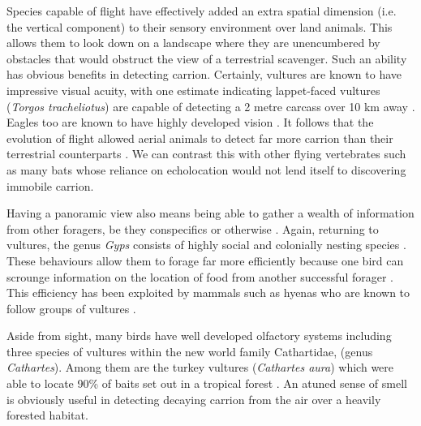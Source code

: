 \documentclass[a4paper,12pt]{article}
\begin{document}
Species capable of flight have effectively added an extra spatial dimension (i.e. the vertical component) to their sensory environment over land animals.
This allows them to look down on a landscape where they are unencumbered by obstacles that would obstruct the view of a terrestrial scavenger.
Such an ability has obvious benefits in detecting carrion.
Certainly, vultures are known to have impressive visual acuity, with one estimate indicating lappet-faced vultures %
 (\textit{Torgos tracheliotus}) are capable of detecting a 2 metre carcass over 10 km away \citep{spiegel2013factors}.
Eagles too are known to have highly developed vision \citep{reymond1985spatial}.
It follows that the evolution of flight allowed aerial animals to detect far more carrion than their terrestrial counterparts \citep{AR:AR22815}.
We can contrast this with other flying vertebrates such as many bats whose reliance on echolocation would not lend itself to discovering immobile carrion.
% 


Having a panoramic view also means being able to gather a wealth of information from other foragers, be they conspecifics or otherwise \citep{jackson2008effect}.
Again, returning to vultures, the genus \textit{Gyps} consists of highly social and colonially nesting species \citep{fernandez2015density}.
These behaviours allow them to forage far more efficiently because one bird can scrounge information on the location of food from another successful forager \citep{KaneVul}.
This efficiency has been exploited by mammals such as hyenas who are known to follow groups of vultures \citep{jones2015african}. 



Aside from sight, many birds have well developed olfactory systems \citep{AR:AR22815} including three species of vultures within the new world family Cathartidae, (genus \textit{Cathartes}).
Among them are the turkey vultures (\textit{Cathartes aura}) which were able to locate 90\% of baits set out in a tropical forest \citep{houston1986olfaction}.
An atuned sense of smell is obviously useful in detecting decaying carrion from the air over a heavily forested habitat.
\end{document}
